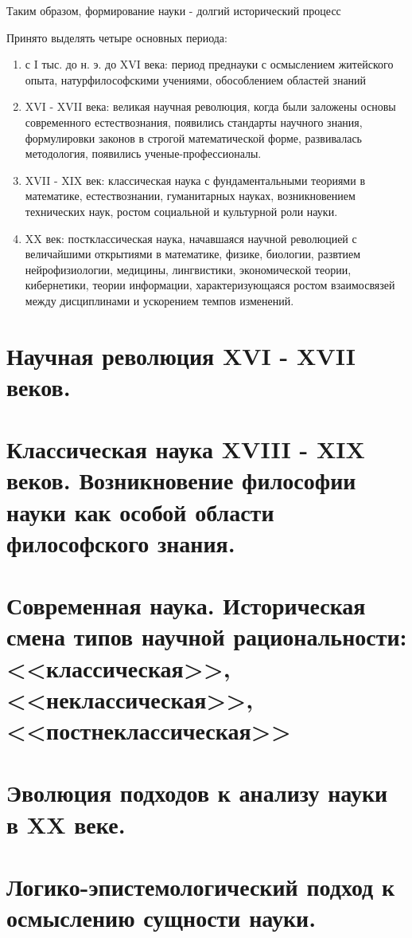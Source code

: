 \documentclass[12pt, specialist, subf, substylefile = spbu.rtx]{disser}
\begin{document}
Таким образом, формирование науки - долгий исторический процесс

Принято выделять четыре основных периода:
\begin{enumerate}
	\item с I тыс. до н. э. до XVI века: период преднауки с осмыслением житейского опыта, натурфилософскими учениями, обособлением областей знаний
	\item XVI - XVII века: великая научная революция, когда были заложены основы современного естествознания, появились стандарты научного знания, формулировки законов в строгой математической форме, развивалась методология, появились ученые-профессионалы.
	\item XVII - XIX век: классическая наука с фундаментальными теориями в математике, естествознании, гуманитарных науках, возникновением технических наук, ростом социальной и культурной роли науки.
	\item XX век: постклассическая наука, начавшаяся научной революцией с величайшими открытиями в математике, физике, биологии, развтием нейрофизиологии, медицины, лингвистики, экономической теории, кибернетики, теории информации, характеризующаяся ростом взаимосвязей между дисциплинами и ускорением темпов изменений.
\end{enumerate}

\section{Научная революция XVI - XVII веков.}

\section{Классическая наука XVIII - XIX веков. Возникновение философии науки как особой области философского знания.}

\section{Современная наука. Историческая смена типов научной рациональности: <<классическая>>, <<неклассическая>>, <<постнеклассическая>>}

\section{Эволюция подходов к анализу науки в XX веке.}

\section{Логико-эпистемологический подход к осмыслению сущности науки.}
\end{document}
